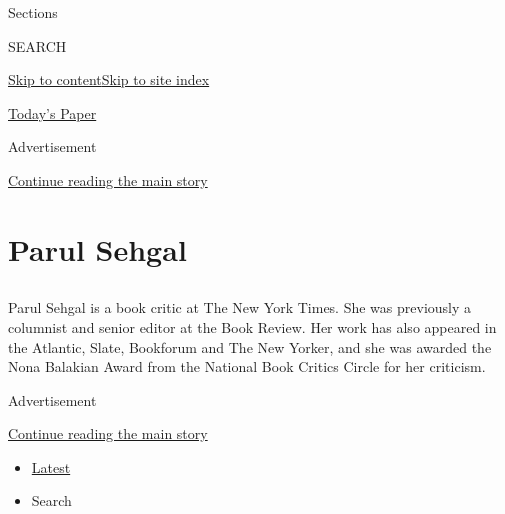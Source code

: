Sections

SEARCH

\protect\hyperlink{site-content}{Skip to
content}\protect\hyperlink{site-index}{Skip to site index}

\href{https://myaccount.nytimes.com/auth/login?response_type=cookie\&client_id=vi}{}

\href{https://www.nytimes.com/section/todayspaper}{Today's Paper}

Advertisement

\protect\hyperlink{after-top}{Continue reading the main story}

\hypertarget{parul-sehgal}{%
\section{Parul Sehgal}\label{parul-sehgal}}

\subsection{}

Parul Sehgal is a book critic at The New York Times. She was previously
a columnist and senior editor at the Book Review. Her work has also
appeared in the Atlantic, Slate, Bookforum and The New Yorker, and she
was awarded the Nona Balakian Award from the National Book Critics
Circle for her criticism.

Advertisement

\protect\hyperlink{after-mid1}{Continue reading the main story}

\begin{itemize}
\tightlist
\item
  \protect\hyperlink{stream-panel}{Latest}
\item
  Search
\end{itemize}


